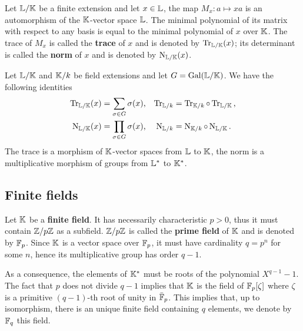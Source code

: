 Let $\mathbb{L}/\mathbb{K}$ be a finite extension and let $x\in\mathbb{L}$, the map
$M_x:a\mapsto xa$ is an automorphism of the $\mathbb{K}$-vector space
$\mathbb{L}$. The minimal polynomial of its matrix with respect to any basis
is equal to the minimal polynomial of $x$ over $\mathbb{K}$.  The trace of
$M_x$ is called the \textbf{trace} of $x$
and is denoted by
$\operatorname{Tr}_{\mathbb{L}/\mathbb{K}}(x)$; its determinant is called the \textbf{norm}
of $x$ and is denoted by
$\operatorname{N}_{\mathbb{L}/\mathbb{K}}(x)$.

\begin{proposition}
  \label{th:basic-galois-theory:trace}
  Let $\mathbb{L}/\mathbb{K}$ and $\mathbb{K}/k$ be field extensions and let
  $G=\operatorname{Gal}(\mathbb{L}/\mathbb{K})$. We have the following identities
  \begin{align*}
    \operatorname{Tr}_{\mathbb{L}/\mathbb{K}}(x) &= \sum_{\sigma\in G}\sigma(x) \text{,}&
    \operatorname{Tr}_{\mathbb{L}/k} &= \operatorname{Tr}_{\mathbb{K}/k}\circ\operatorname{Tr}_{\mathbb{L}/\mathbb{K}}\text{,}\\
    \operatorname{N}_{\mathbb{L}/\mathbb{K}}(x) &= \prod_{\sigma\in G}\sigma(x) \text{,}&
    \operatorname{N}_{\mathbb{L}/k} &= \operatorname{N}_{\mathbb{K}/k}\circ\operatorname{N}_{\mathbb{L}/\mathbb{K}}\text{.}
  \end{align*}
  The trace is a morphism of $\mathbb{K}$-vector spaces from $\mathbb{L}$ to $\mathbb{K}$,
  the norm is a multiplicative morphism of groups from $\mathbb{L}^\ast$ to
  $\mathbb{K}^\ast$.
\end{proposition}


\subsection{Finite fields}
\label{sec:basic-galois-theory:finite-fields}

Let $\mathbb{K}$ be a  \textbf{finite field}. It has
necessarily characteristic $p>0$, thus it must contain $\mathbb{Z}/p\mathbb{Z}$ as a
subfield. $\mathbb{Z}/p\mathbb{Z}$ is called the \textbf{prime
  field} of $\mathbb{K}$ and is denoted by $\mathbb{F}_p$. Since $\mathbb{K}$ is a vector
space over $\mathbb{F}_p$, it must have cardinality $q=p^n$ for some $n$,
hence its multiplicative group has order $q-1$.

As a consequence, the elements of $\mathbb{K}^\ast$ must be roots of the
polynomial $X^{q-1}-1$. The fact that $p$ does not divide $q-1$
implies that $\mathbb{K}$ is the field of $\mathbb{F}_p[\zeta]$ where $\zeta$ is a
primitive $(q-1)$-th root of unity in $\bar{\mathbb{F}}_p$. This implies that,
up to isomorphism, there is an unique finite field containing $q$
elements, we denote by $\mathbb{F}_q$ this field.

